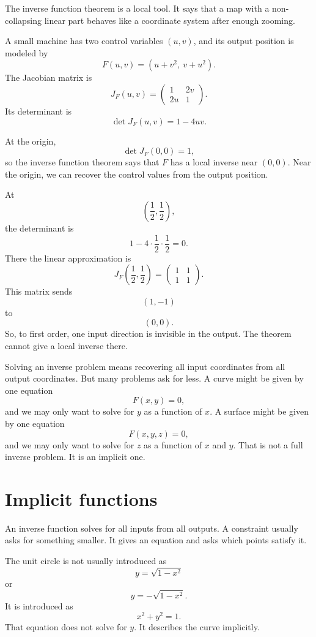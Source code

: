 The inverse function theorem is a local tool.  It says that a map with a non-collapsing
linear part behaves like a coordinate system after enough zooming.

\begin{example}
A small machine has two control variables \((u,v)\), and its output position is modeled by
\[
    F(u,v)=(u+v^2,\ v+u^2).
\]
The Jacobian matrix is
\[
    J_F(u,v)=
    \begin{pmatrix}
        1 & 2v\\
        2u & 1
    \end{pmatrix}.
\]
Its determinant is
\[
    \det J_F(u,v)=1-4uv.
\]

At the origin,
\[
    \det J_F(0,0)=1,
\]
so the inverse function theorem says that \(F\) has a local inverse near \((0,0)\).
Near the origin, we can recover the control values from the output position.

At
\[
    \left(\frac12,\frac12\right),
\]
the determinant is
\[
    1-4\cdot\frac12\cdot\frac12=0.
\]
There the linear approximation is
\[
    J_F\left(\frac12,\frac12\right)
    =
    \begin{pmatrix}
        1 & 1\\
        1 & 1
    \end{pmatrix}.
\]
This matrix sends
\[
    (1,-1)
\]
to
\[
    (0,0).
\]
So, to first order, one input direction is invisible in the output.  The theorem cannot
give a local inverse there.
\end{example}

Solving an inverse problem means recovering all input coordinates from all output
coordinates.  But many problems ask for less.  A curve might be given by one equation
\[
    F(x,y)=0,
\]
and we may only want to solve for \(y\) as a function of \(x\).  A surface might be given
by one equation
\[
    F(x,y,z)=0,
\]
and we may only want to solve for \(z\) as a function of \(x\) and \(y\).  That is not a
full inverse problem.  It is an implicit one.

\section{Implicit functions}
\label{sec:8.6}

An inverse function solves for all inputs from all outputs.  A constraint usually asks for
something smaller.  It gives an equation and asks which points satisfy it.

The unit circle is not usually introduced as
\[
    y=\sqrt{1-x^2}
\]
or
\[
    y=-\sqrt{1-x^2}.
\]
It is introduced as
\[
    x^2+y^2=1.
\]
That equation does not solve for \(y\).  It describes the curve implicitly.

